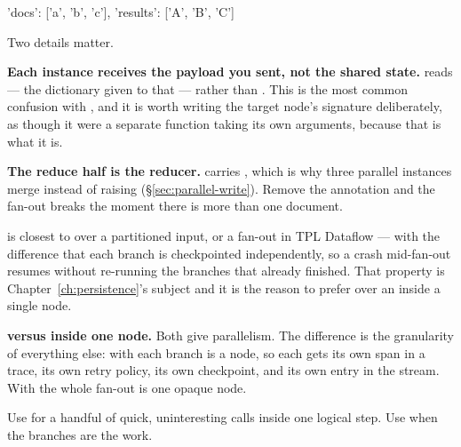 \begin{console}
{'docs': ['a', 'b', 'c'], 'results': ['A', 'B', 'C']}
\end{console}


Two details matter.

\textbf{Each instance receives the payload you sent, not the shared state.}
 reads  --- the dictionary given to that
 --- rather than . This is the most common
confusion with , and it is worth writing the target node's signature
deliberately, as though it were a separate function taking its own arguments,
because that is what it is.

\textbf{The reduce half is the reducer.}  carries
, which is why three parallel instances merge instead of
raising  (\S\ref{sec:parallel-write}). Remove the
annotation and the fan-out breaks the moment there is more than one document.

\begin{dotnetbox}
 is closest to  over a partitioned input, or a
fan-out in TPL Dataflow --- with the difference that each branch is checkpointed
independently, so a crash mid-fan-out resumes without re-running the branches
that already finished. That property is Chapter~\ref{ch:persistence}'s subject
and it is the reason to prefer  over an  inside a
single node.
\end{dotnetbox}

\begin{note}
\textbf{ versus  inside one node.} Both give parallelism.
The difference is the granularity of everything else: with  each branch
is a node, so each gets its own span in a trace, its own retry policy, its own
checkpoint, and its own entry in the stream. With  the whole fan-out
is one opaque node.

Use  for a handful of quick, uninteresting calls inside one logical
step. Use  when the branches are the work.
\end{note}

